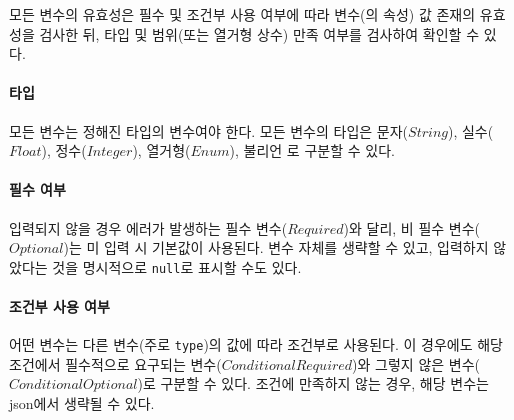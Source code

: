 \newcommand{\jsontableunit}[1]{%
  \ifthenelse{\equal{#1}{}}{-}{$#1$}%
}

\newcommand{\jsontabledash}[1]{%
  \ifthenelse{\equal{#1}{}}{-}{#1}%
}

\newcommand{\jsontablerow}[7]{%
  \nolinkurl{#1} & #2 & #3 &
  \jsontabledash{#4} & \jsontabledash{#5} & \jsontabledash{#6} & \jsontableunit{#7} \\
}

\newcommand{\needtobeexplain}{상세설명 참고}

\newcommand{\jsontable}[2]{
  \begin{table}[htbp]
    \centering
    \caption{grjson 구조에서 \texttt{#1} 클래스의 속성들}
    {\footnotesize
    \begin{tabularx}{\textwidth}{l c c c Y Y c}
      \toprule
      변수명 & 타입 & 필수 & 기본값 & 조건 & 범위/길이/선택지 & 단위 \\
      \midrule
      #2
      \bottomrule
    \end{tabularx}
   } 
  \end{table}
}

모든 변수의 유효성은 필수 및 조건부 사용 여부에 따라 변수(의 속성) 값 존재의 유효성을 검사한 뒤, 타입 및 범위(또는 열거형 상수) 만족 여부를 검사하여 확인할 수 있다.

\paragraph{타입} 모든 변수는 정해진 타입의 변수여야 한다. 모든 변수의 타입은 문자($String$), 실수($Float$), 정수($Integer$), 열거형($Enum$), 불리언 로 구분할 수 있다. 

\paragraph{필수 여부} 입력되지 않을 경우 에러가 발생하는 필수 변수($Required$)와 달리, 비 필수 변수($Optional$)는 미 입력 시 기본값이 사용된다. 변수 자체를 생략할 수 있고, 입력하지 않았다는 것을 명시적으로 \texttt{null}로 표시할 수도 있다.

\paragraph{조건부 사용 여부} 어떤 변수는 다른 변수(주로 \texttt{type})의 값에 따라 조건부로 사용된다. 이 경우에도 해당 조건에서 필수적으로 요구되는 변수($Conditional Required$)와 그렇지 않은 변수($Conditional Optional$)로 구분할 수 있다. 조건에 만족하지 않는 경우, 해당 변수는 json에서 생략될 수 있다.

